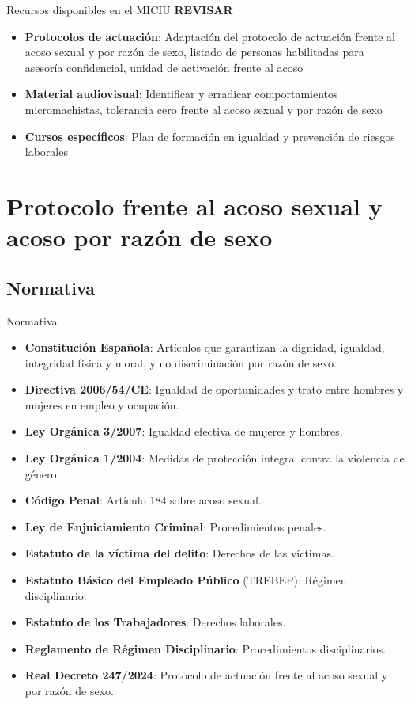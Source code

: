\documentclass{beamer}
\begin{document}
    \begin{frame}{Recursos disponibles en el MICIU}
        \textbf{REVISAR}
        \begin{itemize}
            \item \textbf{Protocolos de actuación}: Adaptación del protocolo de actuación frente al acoso sexual y por razón de sexo, listado de personas habilitadas para asesoría confidencial, unidad de activación frente al acoso
            \item \textbf{Material audiovisual}: Identificar y erradicar comportamientos micromachistas, tolerancia cero frente al acoso sexual y por razón de sexo
            \item \textbf{Cursos específicos}: Plan de formación en igualdad y prevención de riesgos laborales
        \end{itemize}
    \end{frame}


    \section{Protocolo frente al acoso sexual y acoso por razón de sexo}

    \subsection{Normativa}
    \begin{frame}{Normativa}
        \begin{itemize}
            \item \textbf{Constitución Española}: Artículos que garantizan la dignidad, igualdad, integridad física y moral, y no discriminación por razón de sexo.
            \item \textbf{Directiva 2006/54/CE}: Igualdad de oportunidades y trato entre hombres y mujeres en empleo y ocupación.
            \item \textbf{Ley Orgánica 3/2007}: Igualdad efectiva de mujeres y hombres.
            \item \textbf{Ley Orgánica 1/2004}: Medidas de protección integral contra la violencia de género.
            \item \textbf{Código Penal}: Artículo 184 sobre acoso sexual.
            \item \textbf{Ley de Enjuiciamiento Criminal}: Procedimientos penales.
            \item \textbf{Estatuto de la víctima del delito}: Derechos de las víctimas.
            \item \textbf{Estatuto Básico del Empleado Público} (TREBEP): Régimen disciplinario.
            \item \textbf{Estatuto de los Trabajadores}: Derechos laborales.
            \item \textbf{Reglamento de Régimen Disciplinario}: Procedimientos disciplinarios.
            \item \textbf{Real Decreto 247/2024}: Protocolo de actuación frente al acoso sexual y por razón de sexo.
        \end{itemize}
    \end{frame}
\end{document}
